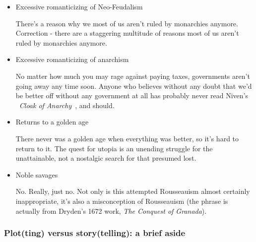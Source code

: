 \begin{itemize}
\begin{itemize}
\item Excessive romanticizing of Neo-Feudalism

There's a reason why we most of us aren't ruled by monarchies
anymore. Correction - there are a staggering multitude of reasons most
of us aren't ruled by monarchies anymore.

\item Excessive romanticizing of anarchism

No matter how much you may rage against paying taxes, governments
aren't going away any time soon. Anyone who believes without any doubt
that we'd be better off without any government at all has probably
never read Niven's ~\emph{Cloak of
Anarchy}~\cite{PurpleRobeofAnarchy}, and should.

\item Returns to a golden age

There never was a golden age when everything was better, so it's hard
to return to it. The quest for utopia is an unending struggle for the
unattainable, not a nostalgic search for that presumed lost.

\item Noble savages

No. Really, just no. Not only is this attempted Rousseauism almost
certainly inappropriate, it's also a misconception of Rousseauism (the
phrase is actually from Dryden's 1672 work, \emph{The Conquest of
Granada}).

\end{itemize}

\end{itemize}

\subsubsection{Plot(ting) versus story(telling): a brief aside}

